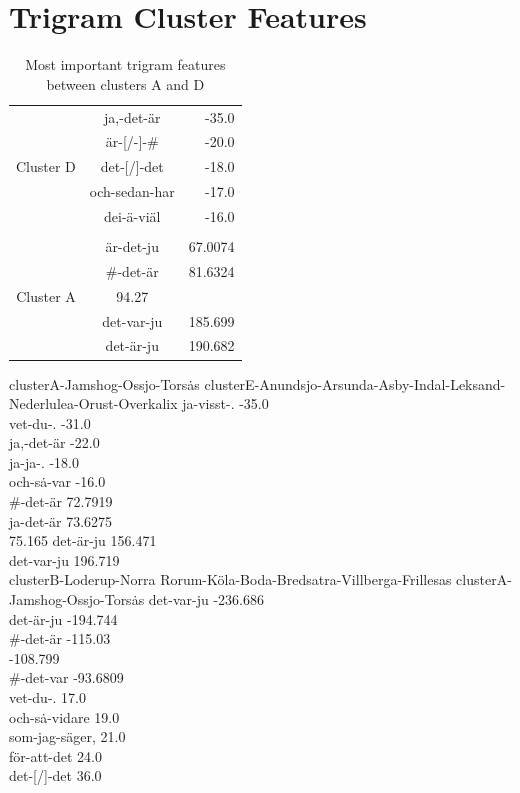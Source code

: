 \section{Trigram Cluster Features}
\begin{table}
\begin{tabular}{rcr}
& ja,-det-\"ar & -35.0 \\
& \"ar-[/-]-\# & -20.0 \\
Cluster D & det-[/]-det & -18.0 \\
& och-sedan-har & -17.0 \\
& dei-\"a-vi\"al & -16.0 \\ \hline \\
& \"ar-det-ju & 67.0074 \\
& \#-det-\"ar & 81.6324 \\
 Cluster A & 94.27 & \\
& det-var-ju & 185.699 \\
& det-\"ar-ju & 190.682 \\
\end{tabular}
\label{trigram-feature-A-D}
\caption{Most important trigram features between clusters A and D}
\end{table}

clusterA-Jamshog-Ossjo-Tors\.as
clusterE-Anundsjo-Arsunda-Asby-Indal-Leksand-Nederlulea-Orust-Overkalix
ja-visst-. -35.0 \\
vet-du-. -31.0 \\
ja,-det-\"ar -22.0 \\
ja-ja-. -18.0 \\
och-s\.a-var -16.0 \\
\#-det-\"ar 72.7919 \\
ja-det-\"ar 73.6275 \\
 75.165
det-\"ar-ju 156.471 \\
det-var-ju 196.719 \\


clusterB-Loderup-Norra Rorum-K\"ola-Boda-Bredsatra-Villberga-Frillesas
clusterA-Jamshog-Ossjo-Tors\.as
det-var-ju -236.686 \\
det-\"ar-ju -194.744 \\
\#-det-\"ar -115.03 \\
 -108.799 \\
\#-det-var -93.6809 \\
vet-du-. 17.0 \\
och-s\.a-vidare 19.0 \\
som-jag-s\"ager, 21.0 \\
f\"or-att-det 24.0 \\
det-[/]-det 36.0 \\


